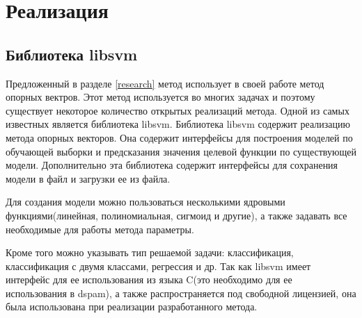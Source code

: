 \newpage
\section{Реализация}

\subsection{Библиотека libsvm}
Предложенный в разделе \ref{research} метод использует в своей работе метод опорных вектров. Этот метод используется во многих задачах и поэтому существует некоторое количество открытых реализаций метода. Одной из самых известных является библиотека libsvm\cite{LIBSVM}.
Библиотека libsvm содержит реализацию метода опорных векторов. Она содержит интерфейсы для построения моделей по обучающей выборки и предсказания значения целевой функции по  существующей модели. Дополнительно эта библиотека содержит интерфейсы для сохранения модели в файл и загрузки ее из файла.

Для создания модели можно пользоваться несколькими ядровыми функциями(линейная, полиномиальная, сигмоид и другие), а также задавать все необходимые для работы метода параметры.

Кроме того можно указывать тип решаемой задачи: классификация, классификация с двумя классами, регрессия и др.
Так как libsvm имеет интерфейс для ее использования из языка C(это необходимо для ее использования в dspam), а также распространяется под свободной лицензией, она была использована при реализации разработанного метода.



